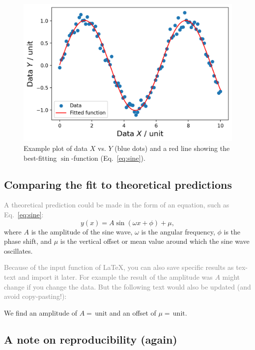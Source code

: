 \documentclass[
  journal=pasa,
  manuscript=Research-Article,
  year=2025,
  volume=X,
]{cup-journal}
\newcommand{\comment}[1]{\textcolor{gray}{#1}}
\begin{document}
\begin{figure}
    \centering
    \includegraphics[width=\columnwidth]{figures/sin_fit_x_y.png}
    \caption{Example plot of data $X$ vs. $Y$ (blue dots) and a red line showing the best-fitting $\sin$-function (Eq.~\ref{eq:sine}).}
    \label{fig:sin_fit_x_y}
\end{figure}

\subsection{Comparing the fit to theoretical predictions} \label{sec:analysis_comparison}

\comment{A theoretical prediction could be made in the form of an equation, such as Eq.~\ref{eq:sine}:}
\begin{equation}
    y(x) = A \sin(\omega x + \phi) + \mu, \label{eq:sine}
\end{equation}
where $A$ is the amplitude of the sine wave, $\omega$ is the angular frequency, $\phi$ is the phase shift, and $\mu$ is the vertical offset or mean value around which the sine wave oscillates.

\comment{Because of the input function of \LaTeX, you can also save specific results as tex-text and import it later. For example the result of the amplitude was $A$ might change if you change the data. But the following text would also be updated (and avoid copy-pasting!):}

We find an amplitude of $A = \,\mathrm{unit}$ and an offset of $\mu = \,\mathrm{unit}$.

\subsection{A note on reproducibility (again)}\label{sec:analysis_reproducibility}
\end{document}
